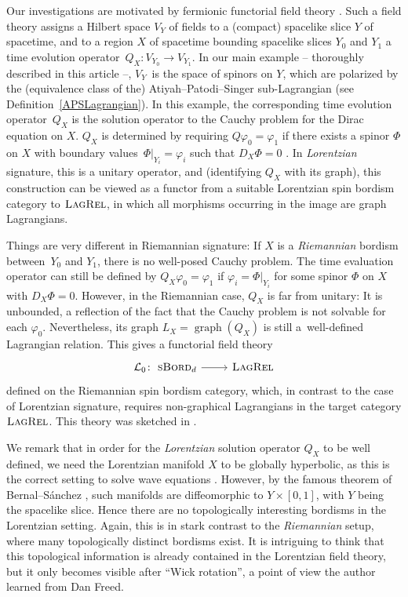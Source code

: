 \documentclass[10pt,a4paper]{amsart}
\numberwithin{equation}{section}
\DeclareMathOperator{\graph}{\mathrm{graph}}
\newcommand{\LagRel}{\textsc{LagRel}}
\newcommand{\sBord}{\textsc{sBord}}
\begin{document}
Our investigations are motivated by fermionic functorial field theory \cite{DaiFreed, FreedLectures, LudewigRoos, StolzTeichnerElliptic, StolzTeichnerSusy}.
Such a field theory assigns a Hilbert space $V_Y$ of fields to a (compact) spacelike slice $Y$ of spacetime, and to a region $X$ of spacetime bounding spacelike slices $Y_0$ and $Y_1$ a time evolution operator~$Q_X\colon V_{Y_0} \to V_{Y_1}$.
In our main example -- thoroughly described in this article --, $V_Y$~is the space of spinors on $Y$, which are polarized by the (equivalence class of the) Atiyah--Patodi--Singer sub-Lagrangian (see Definition~\ref{APSLagrangian}).
In this example, the corresponding time evolution operator~$Q_X$ is the solution operator to the Cauchy problem for the Dirac equation on $X$.
$Q_X$ is determined by requiring $Q \varphi_0 = \varphi_1$ if there exists a spinor $\Phi$ on $X$ with boundary values~${\Phi|_{Y_i} = \varphi_i}$ such that $D_X \Phi = 0$ \cite[Section~2]{BaerStrohmaier}.
In \emph{Lorentzian} signature, this is a unitary operator, and (identifying $Q_X$ with its graph), this construction can be viewed as a functor from a suitable Lorentzian spin bordism category to $\LagRel$, in which all morphisms occurring in the image are graph Lagrangians.

Things are very different in Riemannian signature: If $X$ is a \emph{Riemannian} bordism between~$Y_0$ and $Y_1$, there is no well-posed Cauchy problem.
The time evaluation operator can still be defined by $Q_X\varphi_0 = \varphi_1$ if $\varphi_i = \Phi|_{Y_i}$ for some spinor $\Phi$ on $X$ with $D_X \Phi = 0$.
However, in the Riemannian case, $Q_X$ is far from unitary:
It is unbounded, a reflection of the fact that the Cauchy problem is not solvable for each $\varphi_0$.
Nevertheless, its graph $L_X = \graph(Q_X)$ is still a~well-defined Lagrangian relation.
This gives a functorial field theory
\begin{equation}
\label{FieldTheoryIntro}
\begin{tikzcd}
 \mathcal{L}_0\colon\ \sBord_d \ar[r] & \LagRel
\end{tikzcd}
\end{equation}
defined on the Riemannian spin bordism category, which, in contrast to the case of Lorentzian signature, requires non-graphical Lagrangians in the target category $\LagRel$.
This theory was sketched in \cite[Remark~3.16]{LudewigRoos}.

We remark that in order for the \emph{Lorentzian} solution operator $Q_X$ to be well defined, we need the Lorentzian manifold $X$ to be globally hyperbolic, as this is the correct setting to solve wave equations \cite{BGP}.
However, by the famous theorem of Bernal--S\'anchez \cite{BernalSanchez}, such manifolds are diffeomorphic to $Y \times [0, 1]$, with $Y$ being the spacelike slice.
Hence there are no topologically interesting bordisms in the Lorentzian setting.
Again, this is in stark contrast to the \emph{Riemannian} setup, where many topologically distinct bordisms exist.
It is intriguing to think that this topological information is already contained in the Lorentzian field theory, but it only becomes visible after ``Wick rotation'', a point of view the author learned from Dan Freed.
\end{document}

